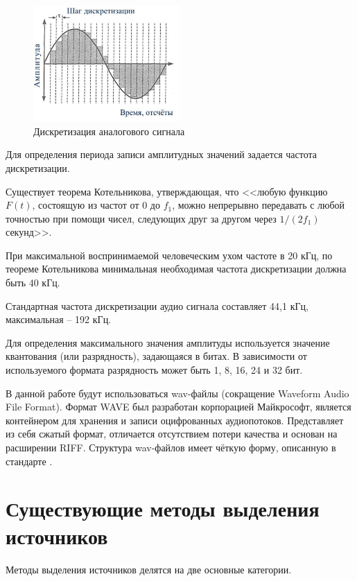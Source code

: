 \begin{figure}
	\centering
	\includegraphics[width=0.5\textwidth]{inc/img/analog-to-bin.png}
	\caption{Дискретизация аналогового сигнала}
	\label{anal:atob}
\end{figure}

Для определения периода записи амплитудных значений задается частота дискретизации. 

Существует теорема Котельникова\cite{Bikkenin}, утверждающая, что <<любую функцию $F(t)$, состоящую из частот от 0 до $f_1$, можно непрерывно передавать с любой точностью при помощи чисел, следующих друг за другом через $1/(2f_1)$ секунд>>.

При максимальной воспринимаемой человеческим ухом частоте в 20 кГц, по теореме Котельникова минимальная необходимая частота дискретизации должна быть 40 кГц.

Стандартная частота дискретизации аудио сигнала составляет 44,1 кГц, максимальная -- 192 кГц.

Для определения максимального значения амплитуды используется значение квантования (или разрядность), задающаяся в битах. В зависимости от используемого формата разрядность может быть 1, 8, 16, 24 и 32 бит.

В данной работе будут использоваться wav-файлы (сокращение Waveform Audio File Format). Формат WAVE был разработан корпорацией Майкрософт, является контейнером для хранения и записи оцифрованных аудиопотоков. Представляет из себя сжатый формат, отличается отсутствием потери качества и основан на расширении RIFF. Структура wav-файлов имеет чёткую форму, описанную в стандарте \cite{wav}.

\section{Существующие методы выделения источников}

Методы выделения источников делятся на две основные категории\cite{mansour:hal-00802445}.

